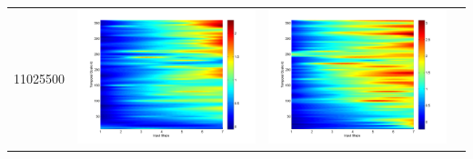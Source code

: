 \documentclass[11pt]{article}
\begin{document}
\begin{table}[H]
{\begin{tabular}{c  c   c   c  }
11025500&\begin{minipage}{.3\textwidth}\includegraphics[width=\linewidth]{resultgraph/11025500p.png}\end{minipage}
&\begin{minipage}{.3\textwidth}\includegraphics[width=\linewidth]{resultgraph/11025500pep.png}\end{minipage}

\end{tabular}}
\end{table}
\end{document}
